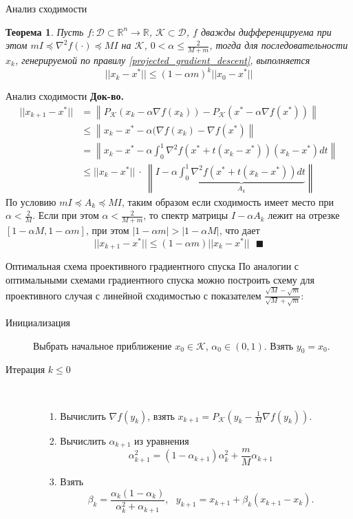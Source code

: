 \documentclass[10pt, handout]{beamer}
\newcounter{thm}
\newtheorem{theorem_ru}[thm]{Теорема}
\begin{document}
\begin{frame}{Анализ сходимости}
\begin{theorem_ru}
Пусть $f:\mathcal{D}\subset\mathbb{R}^n\rightarrow \mathbb{R}$, $\mathcal{K}\subset \mathcal{D}$, $f$ дважды дифференцируема при этом $mI\preceq \nabla^2 f(\cdot) \preceq MI$ на $\mathcal{K}$, $0<\alpha\leq\frac{2}{M+m}$, тогда для последовательности $x_k$, генерируемой по правилу \eqref{projected_gradient_descent},
выполняется
$$
||x_k-x^*||\leq \left(1-\alpha m\right)^k||x_0-x^*||
$$
\end{theorem_ru}
\end{frame}

\begin{frame}{Анализ сходимости}
\textbf{Док-во.} 
\begin{align*}
||x_{k+1}-x^*||&=\left\|P_\mathcal{K}\left(x_k-\alpha\nabla f(x_k)\right)-P_\mathcal{K}\left(x^*-\alpha\nabla f(x^*)\right)\right\|\\
&\leq \left\|x_k-x^*-\alpha(\nabla f(x_k)-\nabla f(x^*) \right\|\\
&=\left\|x_k-x^*-\alpha\int_0^1\nabla^2f(x^*+t(x_k-x^*))(x_k-x^*)dt\right\|\\
&\leq ||x_k-x^*||~\cdot~\left\|I-\alpha\underbrace{\int_0^1\nabla^2f(x^*+t(x_k-x^*))dt}_{A_k}\right\|
\end{align*}
\pause
По условию $mI\preceq A_k\preceq MI$, таким образом если сходимость имеет место при $\alpha<\frac{2}{M}$. Если при этом $\alpha<\frac{2}{M+m}$, то
спектр матрицы $I-\alpha A_k$ лежит на отрезке $[1-\alpha M, 1-\alpha m]$, при этом $|1-\alpha m|>|1-\alpha M|$, что дает
$$
||x_{k+1}-x^*||\leq (1-\alpha m) ||x_k-x^*||~~~\blacksquare
$$
\end{frame}

\begin{frame}{Оптимальная схема проективного градиентного спуска}
По аналогии с оптимальными схемами градиентного спуска можно построить схему для проективного случая с линейной сходимостью с показателем
$\frac{\sqrt{M}-\sqrt{m}}{\sqrt{M}+\sqrt{m}}$:
\begin{description}
\item[Инициализация] Выбрать начальное приближение $x_0\in \mathcal{K}$, $\alpha_0\in(0,1)$. Взять $y_0=x_0$.
\item[Итерация $k\leq 0$] ~\\
\begin{itemize}
\item[1.] Вычислить $\nabla f(y_k)$, взять $x_{k+1}=P_\mathcal{K}(y_k-\frac{1}{M}\nabla f(y_k))$.
\item[2.] Вычислить $\alpha_{k+1}$ из уравнения $$\alpha_{k+1}^2=(1-\alpha_{k+1})\alpha_k^2+\frac{m}{M}\alpha_{k+1}$$
\item[3.] Взять
$$
\beta_k=\frac{\alpha_k(1-\alpha_k)}{\alpha_k^2+\alpha_{k+1}},~~~y_{k+1}=x_{k+1}+\beta_k(x_{k+1}-x_k).
$$
\end{itemize}	
\end{description}

\end{frame}
\end{document}
